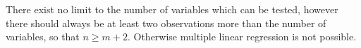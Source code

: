 There exist no limit to the number of variables which can be tested, however there should always be at least two observations more than the number of variables, so that $n \geq m+2$. Otherwise multiple linear regression is not possible. \cite{zar2009}












